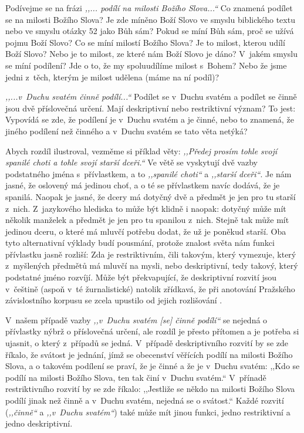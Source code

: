 Podívejme se na frázi \textit{,,... podílí na milosti Božího Slova...``} Co znamená podílet se na
milosti Božího Slova? Je zde míněno Boží Slovo ve smyslu biblického textu nebo
ve smyslu otázky 52 jako Bůh sám? Pokud se míní Bůh sám, proč se užívá pojmu
Boží Slovo? Co se míní milostí Božího Slova? Je to milost, kterou udílí Boží
Slovo? Nebo je to milost, ze které nám Boží Slovo je dáno? V~jakém smyslu se
míní podílení? Jde o to, že my spoluudílíme milost s~Bohem? Nebo že jsme jedni
z~těch, kterým je milost udělena (máme na ní podíl)?

\textit{,,...v~Duchu svatém činně podílí...``} Podílet se v~Duchu svatém a
podílet se činně jsou dvě příslovečná určení. Mají deskriptivní nebo
restriktivní význam? To jest: Vypovídá se zde, že podílení je v~Duchu svatém a
je činné, nebo to znamená, že jiného podílení než činného a v~Duchu svatém se
tato věta netýká?

Abych rozdíl ilustroval, vezměme si příklad věty: \textit{,,Předej prosím tohle
svojí spanilé choti a tohle svojí starší dceři.``} Ve větě se vyskytují dvě
vazby podstatného jména s~přívlastkem, a to \textit{,,spanilé choti``} a
\textit{,,starší dceři``}. Je nám jasné, že oslovený má jedinou choť, a o té se
přívlastkem navíc dodává, že je spanilá. Naopak je jasné, že dcery má dotyčný
dvě a předmět je jen pro tu starší z~nich. Z~jazykového hlediska to může být
klidně i naopak: dotyčný může mít několik manželek a předmět je jen pro tu
spanilou z~nich. Stejně tak může mít jedinou dceru, o které má mluvčí potřebu
dodat, že už je poněkud starší. Oba tyto alternativní výklady budí pousmání,
protože znalost světa nám funkci přívlastku jasně rozliší: Zda je restriktivním,
čili takovým, který vymezuje, který z~myšlených předmětů má mluvčí na mysli,
nebo deskriptivní, tedy takový, který podstatné jméno rozvíjí. Může být
překvapující, že deskriptivní rozvití jsou v~češtině (aspoň v~té žurnalistické)
natolik zřídkavá, že při anotování Pražského závislostního korpusu se zcela
upustilo od jejich rozlišování \citep{hajicova2000manual}.

V~našem případě vazby \textit{,,v~Duchu svatém [se] činně podílí``} se nejedná o
přívlastky nýbrž o příslovečná určení, ale rozdíl je přesto přítomen a je
potřeba si ujasnit, o který z~případů se jedná. V~případě deskriptivního rozvití
by se zde říkalo, že svátost je jednání, jímž se obecenství věřících
podílí na milosti Božího Slova, a o takovém podílení se praví, že je činné a že
je v~Duchu svatém: ,,Kdo se podílí na milosti Božího Slova, ten tak činí v~Duchu
svatém.`` V~přínadě restriktivního rozvití by se zde říkalo: ,,Jestliže se někdo
na milosti Božího Slova podílí jinak než činně a v~Duchu svatém, nejedná se o
svátost.``
Každé rozvití (\textit{,,činně``} a \textit{,,v~Duchu svatém``}) také může mít
jinou funkci, jedno restriktivní a jedno deskriptivní.

